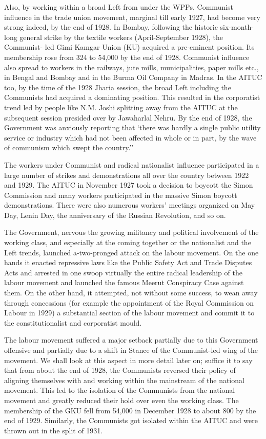 Also, by working within a broad Left from under the WPPs, Communist influence in the trade union movement, marginal till early 1927, had become very strong indeed, by the end of 1928. In Bombay, following the historic six-month-long general strike by the textile workers (April-September 1928), the Communist- led Gimi Kamgar Union (KU) acquired a pre-eminent position. Its membership rose from 324 to 54,000 by the end of 1928. Communist influence also spread to workers in the railways, jute mills, municipalities, paper mills etc., in Bengal and Bombay and in the Burma Oil Company in Madras. In the AITUC too, by the time of the 1928 Jharia session, the broad Left including the Communists had acquired a dominating position. This resulted in the corporatist trend led by people like N.M. Joshi splitting away from the AITUC at the subsequent session presided over by Jawaharlal Nehru. By the end of 1928, the Government was anxiously reporting that `there was hardly a single public utility service or industry which had not been affected in whole or in part, by the wave of communism which swept the country.''

The workers under Communist and radical nationalist influence participated in a large number of strikes and demonstrations all over the country between 1922 and 1929. The AITUC in November 1927 took a decision to boycott the Simon Commission and many workers participated in the massive Simon boycott demonstrations. There were also numerous workers' meetings organized on May Day, Lenin Day, the anniversary of the Russian Revolution, and so on.

The Government, nervous the growing militancy and political involvement of the working class, and especially at the coming together or the nationalist and the Left trends, launched a-two-pronged attack on the labour movement. On the one hands it enacted repressive laws like the Public Safety Act and Trade Disputes Acts and arrested in one swoop virtually the entire radical leadership of the labour movement and launched the famous Meerut Conspiracy Case against them. On the other hand, it attempted, not without some success, to wean away through concessions (for example the appointment of the Royal Commission on Labour in 1929) a substantial section of the labour movement and commit it to the constitutionalist and corporatist mould.

The labour movement suffered a major setback partially due to this Government offensive and partially due to a shift in Stance of the Communist-led wing of the movement. We shall look at this aspect in more detail later on; suffice it to say that from about the end of 1928, the Communists reversed their policy of aligning themselves with and working within the mainstream of the national movement. This led to the isolation of the Communists from the national movement and greatly reduced their hold over even the working class. The membership of the GKU fell from 54,000 in December 1928 to about 800 by the end of 1929. Similarly, the Communists got isolated within the AITUC and were thrown out in the split of 1931.

